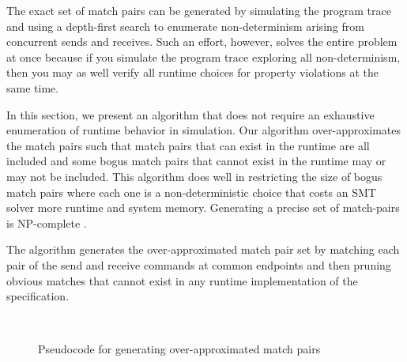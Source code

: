 The exact set of match pairs can be generated by simulating the
program trace and using a depth-first search to enumerate
non-determinism arising from concurrent sends and receives. Such an
effort, however, solves the entire problem at once because if you
simulate the program trace exploring all non-determinism, then you may
as well verify all runtime choices for property violations at the same
time.

In this section, we present an algorithm that does not require
an exhaustive enumeration of runtime behavior in simulation. Our
algorithm over-approximates the match pairs such that match pairs that
can exist in the runtime are all included and some bogus match
pairs that cannot exist in the runtime may or may not be included. This algorithm does well in restricting the size of bogus match pairs where each one is a non-deterministic choice that costs an SMT solver more runtime and system memory. Generating a precise set of match-pairs is NP-complete
\cite{match-pair-np-complete}.


The algorithm generates the over-approximated match pair set by
matching each pair of the send and receive commands at common
endpoints and then pruning obvious matches that cannot exist in any
runtime implementation of the specification.   

\begin{figure}[h]
\setlength{\tabcolsep}{20pt}
\begin{center}
\scalebox{0.7}{\usebox{\boxalgorithm}}\\
\end{center}
\caption{Pseudocode for generating over-approximated match pairs}
\label{fig:pseudocode}
\end{figure}

